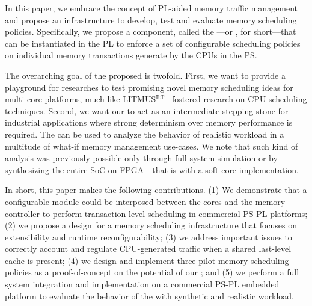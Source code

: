 In this paper, we embrace the concept of PL-aided memory traffic
management and propose an infrastructure to develop, test and evaluate
memory scheduling policies. Specifically, we propose a component,
called the \schimL---or \schim, for short---that can be instantiated
in the PL to enforce a set of configurable scheduling policies on
individual memory transactions generate by the CPUs in the PS.

The overarching goal of the proposed \schim is twofold. First, we want
to provide a playground for researches to test promising novel memory
scheduling ideas for multi-core platforms, much like
LITMUS$^{\text{RT}}$~\cite{litmus-rt} fostered research on CPU
scheduling techniques. Second, we want our \schim to act as an
intermediate stepping stone for industrial applications where strong
determinism over memory performance is required. The \schim can be
used to analyze the behavior of realistic workload in a multitude of
what-if memory management use-cases. We note that such kind of
analysis was previously possible only through full-system simulation
or by synthesizing the entire SoC on FPGA---that is with a soft-core
implementation.

In short, this paper makes the following contributions. (1) We
demonstrate that a configurable module could be interposed between the
cores and the memory controller to perform transaction-level
scheduling in commercial PS-PL platforms; (2) we propose a design for
a memory scheduling infrastructure that focuses on extensibility and
runtime reconfigurability; (3) we address important issues to
correctly account and regulate CPU-generated traffic when a shared
last-level cache is present; (4) we design and implement three pilot
memory scheduling policies as a proof-of-concept on the potential of
our \schim; and (5) we perform a full system integration and
implementation on a commercial PS-PL embedded platform to evaluate the
behavior of the \schim with synthetic and realistic workload.





